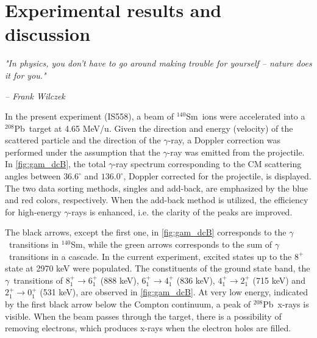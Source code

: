\documentclass[twoside,english]{uiofysmaster/uiofysmaster}
\newcommand{\Sm}{$^{140}$Sm} %
\newcommand{\Pb}{$^{208}$Pb}
\newcommand{\ga}{$\gamma$}
\let\orgautoref\autoref
\renewcommand{\autoref}
        {%
		 \def\sectionautorefname{Section}%
		 \def\subsectionautorefname{Section}%
		 \def\subsubsectionautorefname{Section}%
		 \def\chapterautorefname{Chapter}%
          \orgautoref}
\begin{document}
%		
%		




\chapter{Experimental results and discussion}\label{ch:results}
\epigraph{\textit{"In physics, you don't have to go around making trouble for yourself – nature does it for you."}}{\textit{– Frank Wilczek}}


In the present experiment (IS558), a beam of \Sm\ ions were accelerated into a \Pb\ target at 4.65 MeV/u.
Given the direction and energy (velocity) of the scattered particle and the direction of the \ga-ray, a Doppler correction was performed under the assumption that the \ga-ray was emitted from the projectile.
In \autoref{fig:gam_dcB}, the total \ga-ray spectrum corresponding to the CM scattering angles between $36.6^\circ$ and $136.0^\circ$, Doppler corrected for the projectile, is displayed.
The two data sorting methods, singles and add-back, are emphasized by the blue and red colors, respectively.
When the add-back method is utilized, the efficiency for high-energy \ga-rays is enhanced, i.e. the clarity of the peaks are improved.

The black arrows, except the first one, in \autoref{fig:gam_dcB} corresponds to the \ga\ transitions in \Sm, while the green arrows corresponds to the sum of \ga\ transitions in a cascade.
In the current experiment, excited states up to the $8^+$ state at 2970 keV were populated.
The constituents of the ground state band, the \ga\ transitions of $8_1^+ \rightarrow 6_1^+$ (888 keV), $6_1^+ \rightarrow 4_1^+$ (836 keV), $4_1^+ \rightarrow 2_1^+$ (715 keV) and $2_1^+ \rightarrow 0_1^+$ (531 keV), are observed in \autoref{fig:gam_dcB}.
At very low energy, indicated by the first black arrow below the Compton continuum, a peak of \Pb\ x-rays is visible.
When the beam passes through the target, there is a possibility of removing electrons, which produces x-rays when the electron holes are filled.
\end{document}
